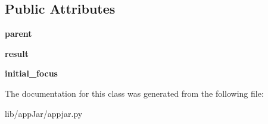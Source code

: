 \subsection*{Public Attributes}
\begin{DoxyCompactItemize}
\item 
\mbox{\label{classappjar_1_1_dialog_a59a2f98582d566e234f040bb6bd8b5a4}} 
{\bfseries parent}
\item 
\mbox{\label{classappjar_1_1_dialog_a6296d27a71cd8dab6847d30e084150b5}} 
{\bfseries result}
\item 
\mbox{\label{classappjar_1_1_dialog_a063639a8d130a38506f72e13170c2389}} 
{\bfseries initial\+\_\+focus}
\end{DoxyCompactItemize}


The documentation for this class was generated from the following file\+:\begin{DoxyCompactItemize}
\item 
lib/app\+Jar/appjar.\+py\end{DoxyCompactItemize}
